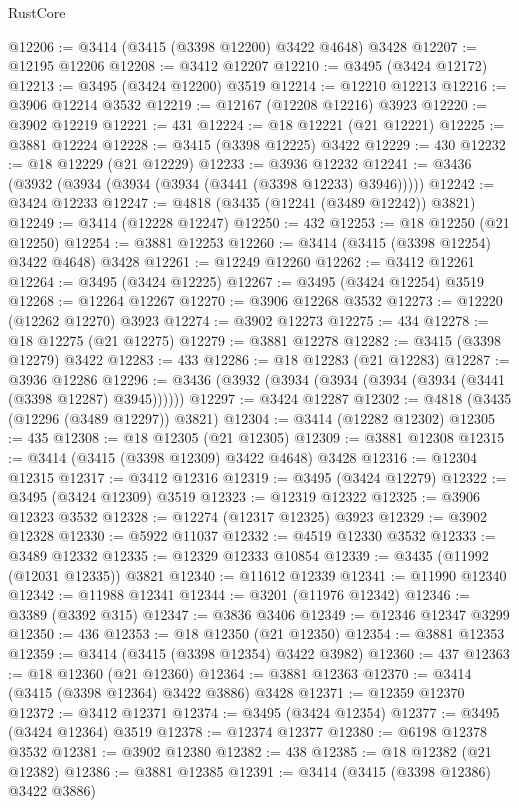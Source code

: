 \begin{lexlean}{RustCore}
\begin{coremodule}
@12206 := @3414 (@3415 (@3398 @12200) @3422 @4648) @3428
@12207 := @12195 @12206
@12208 := @3412 @12207
@12210 := @3495 (@3424 @12172)
@12213 := @3495 (@3424 @12200) @3519
@12214 := @12210 @12213
@12216 := @3906 @12214 @3532
@12219 := @12167 (@12208 @12216) @3923
@12220 := @3902 @12219
@12221 := 431
@12224 := @18 @12221 (@21 @12221)
@12225 := @3881 @12224
@12228 := @3415 (@3398 @12225) @3422
@12229 := 430
@12232 := @18 @12229 (@21 @12229)
@12233 := @3936 @12232
@12241 := @3436 (@3932 (@3934 (@3934 (@3934 (@3441 (@3398 @12233) @3946)))))
@12242 := @3424 @12233
@12247 := @4818 (@3435 (@12241 (@3489 @12242)) @3821)
@12249 := @3414 (@12228 @12247)
@12250 := 432
@12253 := @18 @12250 (@21 @12250)
@12254 := @3881 @12253
@12260 := @3414 (@3415 (@3398 @12254) @3422 @4648) @3428
@12261 := @12249 @12260
@12262 := @3412 @12261
@12264 := @3495 (@3424 @12225)
@12267 := @3495 (@3424 @12254) @3519
@12268 := @12264 @12267
@12270 := @3906 @12268 @3532
@12273 := @12220 (@12262 @12270) @3923
@12274 := @3902 @12273
@12275 := 434
@12278 := @18 @12275 (@21 @12275)
@12279 := @3881 @12278
@12282 := @3415 (@3398 @12279) @3422
@12283 := 433
@12286 := @18 @12283 (@21 @12283)
@12287 := @3936 @12286
@12296 := @3436 (@3932 (@3934 (@3934 (@3934 (@3934 (@3441 (@3398 @12287) @3945))))))
@12297 := @3424 @12287
@12302 := @4818 (@3435 (@12296 (@3489 @12297)) @3821)
@12304 := @3414 (@12282 @12302)
@12305 := 435
@12308 := @18 @12305 (@21 @12305)
@12309 := @3881 @12308
@12315 := @3414 (@3415 (@3398 @12309) @3422 @4648) @3428
@12316 := @12304 @12315
@12317 := @3412 @12316
@12319 := @3495 (@3424 @12279)
@12322 := @3495 (@3424 @12309) @3519
@12323 := @12319 @12322
@12325 := @3906 @12323 @3532
@12328 := @12274 (@12317 @12325) @3923
@12329 := @3902 @12328
@12330 := @5922 @11037
@12332 := @4519 @12330 @3532
@12333 := @3489 @12332
@12335 := @12329 @12333 @10854
@12339 := @3435 (@11992 (@12031 @12335)) @3821
@12340 := @11612 @12339
@12341 := @11990 @12340
@12342 := @11988 @12341
@12344 := @3201 (@11976 @12342)
@12346 := @3389 (@3392 @315)
@12347 := @3836 @3406
@12349 := @12346 @12347 @3299
@12350 := 436
@12353 := @18 @12350 (@21 @12350)
@12354 := @3881 @12353
@12359 := @3414 (@3415 (@3398 @12354) @3422 @3982)
@12360 := 437
@12363 := @18 @12360 (@21 @12360)
@12364 := @3881 @12363
@12370 := @3414 (@3415 (@3398 @12364) @3422 @3886) @3428
@12371 := @12359 @12370
@12372 := @3412 @12371
@12374 := @3495 (@3424 @12354)
@12377 := @3495 (@3424 @12364) @3519
@12378 := @12374 @12377
@12380 := @6198 @12378 @3532
@12381 := @3902 @12380
@12382 := 438
@12385 := @18 @12382 (@21 @12382)
@12386 := @3881 @12385
@12391 := @3414 (@3415 (@3398 @12386) @3422 @3886)

\end{coremodule}
\end{lexlean}
